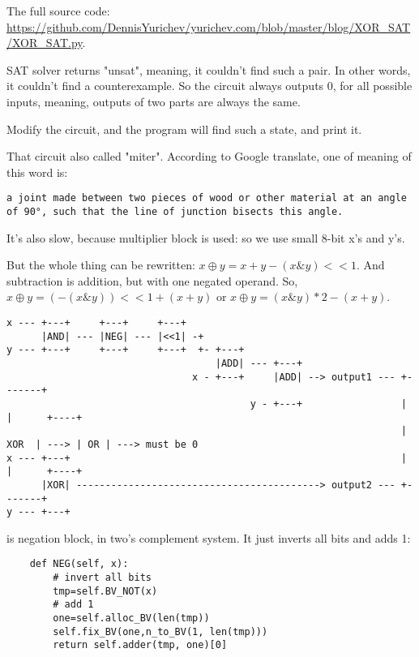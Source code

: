 The full source code: \url{https://github.com/DennisYurichev/yurichev.com/blob/master/blog/XOR_SAT/XOR_SAT.py}.

SAT solver returns "unsat", meaning, it couldn't find such a pair.
In other words, it couldn't find a counterexample.
So the circuit always outputs 0, for all possible inputs, meaning, outputs of two parts are always the same.

Modify the circuit, and the program will find such a state, and print it.

That circuit also called "miter".
According to Google translate, one of meaning of this word is:

\begin{lstlisting}
a joint made between two pieces of wood or other material at an angle of 90°, such that the line of junction bisects this angle.
\end{lstlisting}

It's also slow, because multiplier block is used: so we use small 8-bit x's and y's.

But the whole thing can be rewritten: $x \oplus y = x+y - (x \& y)<<1$.
And subtraction is addition, but with one negated operand.
So, $x \oplus y = (-(x \& y))<<1 + (x + y)$ or
$x \oplus y = (x \& y)*2 - (x + y)$.

\begin{lstlisting}
x --- +---+     +---+     +---+
      |AND| --- |NEG| --- |<<1| -+ 
y --- +---+     +---+     +---+  +- +---+
                                    |ADD| --- +---+
                                x - +---+     |ADD| --> output1 --- +-------+
                                          y - +---+                 |       |      +----+
                                                                    |  XOR  | ---> | OR | ---> must be 0
x --- +---+                                                         |       |      +----+
      |XOR| ------------------------------------------> output2 --- +-------+
y --- +---+
\end{lstlisting}

 is negation block, in two's complement system.
It just inverts all bits and adds 1:

\begin{lstlisting}
    def NEG(self, x):
        # invert all bits
        tmp=self.BV_NOT(x)
        # add 1
        one=self.alloc_BV(len(tmp))
        self.fix_BV(one,n_to_BV(1, len(tmp)))
        return self.adder(tmp, one)[0]
\end{lstlisting}

